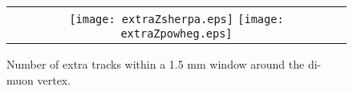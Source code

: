 \begin{table}
\begin{center}
\caption{}
\end{center}
\end{table}

\begin{figure}[!h]
\begin{tabular}{c}
	\texttt{[image: extraZsherpa.eps]}
	\texttt{[image: extraZpowheg.eps]}
\end{tabular}
\caption{Number of extra tracks within a 1.5 mm window around the di-muon vertex.}
\end{figure}
